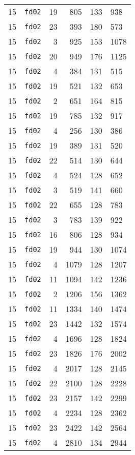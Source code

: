 \documentclass{article}
\begin{document}
\begin{table}[h!]
\begin{tabular}{llrrrl}
    15 & \texttt{fd02} & 19 & 805 & 133 & 938 \\
    15 & \texttt{fd02} & 23 & 393 & 180 & 573 \\
    15 & \texttt{fd02} & 3 & 925 & 153 & 1078 \\
    15 & \texttt{fd02} & 20 & 949 & 176 & 1125 \\
    15 & \texttt{fd02} & 4 & 384 & 131 & 515 \\
    15 & \texttt{fd02} & 19 & 521 & 132 & 653 \\
    15 & \texttt{fd02} & 2 & 651 & 164 & 815 \\
    15 & \texttt{fd02} & 19 & 785 & 132 & 917 \\
    15 & \texttt{fd02} & 4 & 256 & 130 & 386 \\
    15 & \texttt{fd02} & 19 & 389 & 131 & 520 \\
    15 & \texttt{fd02} & 22 & 514 & 130 & 644 \\
    15 & \texttt{fd02} & 4 & 524 & 128 & 652 \\
    15 & \texttt{fd02} & 3 & 519 & 141 & 660 \\
    15 & \texttt{fd02} & 22 & 655 & 128 & 783 \\
    15 & \texttt{fd02} & 3 & 783 & 139 & 922 \\
    15 & \texttt{fd02} & 16 & 806 & 128 & 934 \\
    15 & \texttt{fd02} & 19 & 944 & 130 & 1074 \\
    15 & \texttt{fd02} & 4 & 1079 & 128 & 1207 \\
    15 & \texttt{fd02} & 11 & 1094 & 142 & 1236 \\
    15 & \texttt{fd02} & 2 & 1206 & 156 & 1362 \\
    15 & \texttt{fd02} & 11 & 1334 & 140 & 1474 \\
    15 & \texttt{fd02} & 23 & 1442 & 132 & 1574 \\
    15 & \texttt{fd02} & 4 & 1696 & 128 & 1824 \\
    15 & \texttt{fd02} & 23 & 1826 & 176 & 2002 \\
    15 & \texttt{fd02} & 4 & 2017 & 128 & 2145 \\
    15 & \texttt{fd02} & 22 & 2100 & 128 & 2228 \\
    15 & \texttt{fd02} & 23 & 2157 & 142 & 2299 \\
    15 & \texttt{fd02} & 4 & 2234 & 128 & 2362 \\
    15 & \texttt{fd02} & 23 & 2422 & 142 & 2564 \\
    15 & \texttt{fd02} & 4 & 2810 & 134 & 2944 \\

\end{tabular}
\end{table}
\end{document}
